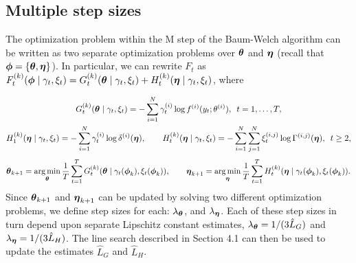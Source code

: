 



\subsection{Multiple step sizes}

The optimization problem within the M step of the Baum-Welch algorithm can be written as two separate optimization problems over $\boldsymbol{\theta}$ and $\boldsymbol{\eta}$ (recall that $\boldsymbol{\phi} = \{\boldsymbol{\theta},\boldsymbol{\eta}\}$). In particular, we can rewrite $F_t$ as $F^{(k)}_t(\boldsymbol{\phi} \mid \gamma_t, \xi_t) = G^{(k)}_t(\boldsymbol{\theta} \mid \gamma_t, \xi_t) + H^{(k)}_t(\boldsymbol{\eta} \mid \gamma_t, \xi_t)$, where

\begin{gather}
    G^{(k)}_t(\boldsymbol{\theta} \mid \gamma_t, \xi_t) = - \sum_{i=1}^N \gamma^{(i)}_t \log f^{(i)}(y_t;\theta^{(i)}), \enspace t = 1,\ldots,T, \\
    H^{(k)}_1(\boldsymbol{\eta} \mid \gamma_t, \xi_t) = - \sum_{i=1}^N \gamma^{(i)}_t \log \delta^{(i)}(\boldsymbol{\eta}), \qquad H^{(k)}_t(\boldsymbol{\eta} \mid \gamma_t, \xi_t) =  - \sum_{i=1}^N \sum_{j=1}^N \xi^{(i,j)}_t \log \Gamma^{(i,j)}(\boldsymbol{\eta}), \enspace t \geq 2,
\end{gather}
%
\begin{equation}
    \boldsymbol{\theta}_{k+1} = \operatorname*{arg\,min}_{\boldsymbol{\theta}} \frac{1}{T} \sum_{t=1}^T G^{(k)}_t(\boldsymbol{\theta} \mid \gamma_t(\boldsymbol{\phi}_k), \xi_t(\boldsymbol{\phi}_k)), \qquad \boldsymbol{\eta}_{k+1} = \operatorname*{arg\,min}_{\boldsymbol{\eta}} \frac{1}{T} \sum_{t=1}^T H^{(k)}_t(\boldsymbol{\eta} \mid \gamma_t(\boldsymbol{\phi}_k), \xi_t(\boldsymbol{\phi}_k)).
\end{equation}
%
Since $\boldsymbol{\theta}_{k+1}$ and $\boldsymbol{\eta}_{k+1}$ can be updated by solving two different optimization problems, we define step sizes for each: $\lambda_{\boldsymbol{\theta}}$, and $\lambda_{\boldsymbol{\eta}}$. Each of these step sizes in turn depend upon separate Lipschitz constant estimates, $\lambda_{\boldsymbol{\theta}} = 1/(3\hat L_G)$ and $\lambda_{\boldsymbol{\eta}} = 1/(3\hat L_H)$. The line search described in Section 4.1 can then be used to update the estimates $\hat L_G$ and $\hat L_H$.


